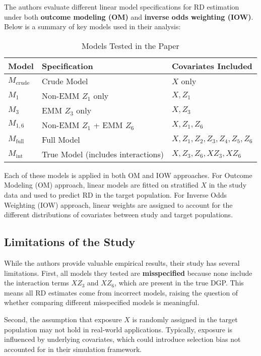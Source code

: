 \documentclass[12pt, oneside]{amsart}
\theoremstyle{definition}
\theoremstyle{remark}
\numberwithin{equation}{section}
\begin{document}
The authors evaluate different linear model specifications for RD estimation under both \textbf{outcome modeling (OM)} and \textbf{inverse odds weighting (IOW)}. Below is a summary of key models used in their analysis:

\begin{table}[h]
    \centering
    \begin{tabular}{lll}
        \toprule
        \textbf{Model} & \textbf{Specification} & \textbf{Covariates Included} \\
        \midrule
        \( M_{\text{crude}} \) & Crude Model & \( X \) only \\
        \( M_1 \) & Non-EMM \( Z_1 \) only & \( X, Z_1 \) \\
        \( M_3 \) & EMM \( Z_3 \) only & \( X, Z_3 \) \\
        \( M_{1,6} \) & Non-EMM \( Z_1 \) + EMM \( Z_6 \) & \( X, Z_1, Z_6 \) \\
        \( M_{\text{full}} \) & Full Model & \( X, Z_1, Z_2, Z_3, Z_4, Z_5, Z_6 \) \\
        \( M_{\text{int}} \) & True Model (includes interactions) & \( X, Z_3, Z_6, X Z_3, X Z_6 \) \\
        \bottomrule
    \end{tabular}
    \caption{Models Tested in the Paper}
\end{table}
Each of these models is applied in both OM and IOW approaches. For Outcome Modeling (OM) approach, linear models are fitted on stratified $X$ in the study data and used to predict RD in the target population. For Inverse Odds Weighting (IOW) approach, linear weights are assigned to account for the different distributions of covariates between study and target populations.\\




\subsection{Limitations of the Study}
While the authors provide valuable empirical results, their study has several limitations. First, all models they tested are \textbf{misspecified} because none include the interaction terms \( XZ_3 \) and \( XZ_6 \), which are present in the true DGP. This means all RD estimates come from incorrect models, raising the question of whether comparing different misspecified models is meaningful.

Second, the assumption that exposure \(X\) is randomly assigned in the target population may not hold in real-world applications. Typically, exposure is influenced by underlying covariates, which could introduce selection bias not accounted for in their simulation framework.
\end{document}
